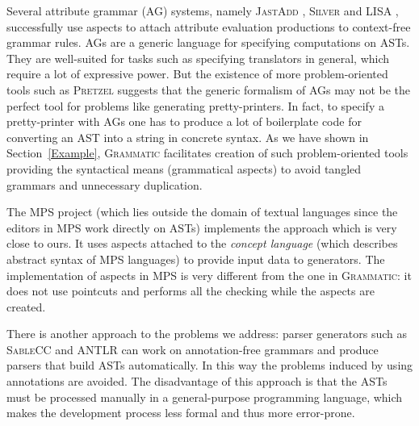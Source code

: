 \documentclass{IOS-Book-Article}     %
\newcommand{\secref}[1]{Section~\ref{#1}}
\newcommand{\tool}[1]{\textsc{#1}}
\newcommand{\Grammatic}[0]{\tool{Grammatic}}
\begin{document}
Several attribute grammar (AG) systems, namely \tool{JastAdd} \cite{JastAdd}, \tool{Silver} \cite{Silver} and \tool{LISA} \cite{LISA}, successfully use aspects to attach attribute evaluation productions to context-free grammar rules.
AGs are a generic language for specifying computations on ASTs. They are well-suited for tasks such as specifying translators in general, which require a lot of expressive power. But the existence of more problem-oriented tools such as \tool{Pretzel} \cite{Pretzel} suggests that the generic formalism of AGs may not be the perfect tool for problems like generating pretty-printers.
In fact, to specify a pretty-printer with AGs one has to produce a lot of boilerplate code for converting an AST into a string in concrete syntax.
As we have shown in \secref{Example}, \Grammatic{} facilitates creation of such problem-oriented tools providing the syntactical means (grammatical aspects) to avoid tangled grammars and unnecessary duplication.

The \tool{MPS} \cite{MPS} project (which lies outside the domain of textual languages since the editors in \tool{MPS} work directly on ASTs) implements the approach which is very close to ours. It uses aspects attached to the \emph{concept language} (which describes abstract syntax of \tool{MPS} languages) to provide input data to generators. The implementation of aspects in \tool{MPS} is very different from the one in \Grammatic{}: it does not use pointcuts and performs all the checking while the aspects are created.

There is another approach to the problems we address: parser generators such as \tool{SableCC} \cite{SableCC} and \tool{ANTLR} \cite{ANTLR} can work on annotation-free grammars and produce parsers that build ASTs automatically. In this way the problems induced by using annotations are avoided. The disadvantage of this approach is that the ASTs must be processed manually in a general-purpose programming language, which makes the development process less formal and thus more error-prone.

%
%
%
%
\end{document}
